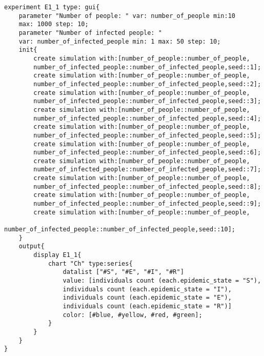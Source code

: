 \documentclass{article}
\begin{document}
\begin{lstlisting}
experiment E1_1 type: gui{
	parameter "Number of people: " var: number_of_people min:10 
	max: 1000 step: 10;
	parameter "Number of infected people: " 
	var: number_of_infected_people min: 1 max: 50 step: 10;
	init{
		create simulation with:[number_of_people::number_of_people,
		number_of_infected_people::number_of_infected_people,seed::1];
		create simulation with:[number_of_people::number_of_people,
		number_of_infected_people::number_of_infected_people,seed::2];
		create simulation with:[number_of_people::number_of_people,
		number_of_infected_people::number_of_infected_people,seed::3];
		create simulation with:[number_of_people::number_of_people,
		number_of_infected_people::number_of_infected_people,seed::4];
		create simulation with:[number_of_people::number_of_people,
		number_of_infected_people::number_of_infected_people,seed::5];
		create simulation with:[number_of_people::number_of_people,
		number_of_infected_people::number_of_infected_people,seed::6];
		create simulation with:[number_of_people::number_of_people,
		number_of_infected_people::number_of_infected_people,seed::7];
		create simulation with:[number_of_people::number_of_people,
		number_of_infected_people::number_of_infected_people,seed::8];
		create simulation with:[number_of_people::number_of_people,
		number_of_infected_people::number_of_infected_people,seed::9];
		create simulation with:[number_of_people::number_of_people,
		number_of_infected_people::number_of_infected_people,seed::10];
	}
	output{
		display E1_1{
			chart "Ch" type:series{
				datalist ["#S", "#E", "#I", "#R"] 
				value: [individuals count (each.epidemic_state = "S"), 		
				individuals count (each.epidemic_state = "I"),			
				individuals count (each.epidemic_state = "E"), 				
				individuals count (each.epidemic_state = "R")] 
				color: [#blue, #yellow, #red, #green]; 			  
			}
		}
	}
}
\end{lstlisting}
\end{document}
